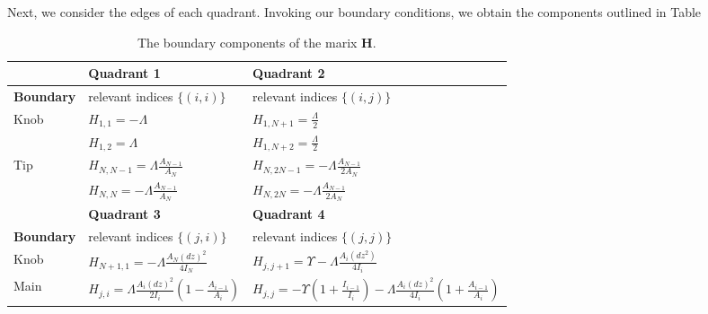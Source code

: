 \documentclass[linenumbers]{aastex7}
\begin{document}
Next, we consider the edges of each quadrant. Invoking our boundary conditions, we obtain the components outlined in Table 

\begin{table}[h!]
    \centering
    {\renewcommand{\arraystretch}{1.6}
    \begin{tabular}{|p{}|p{}|p{}|}
        \hline
        &\textbf{Quadrant 1} & \textbf{Quadrant 2} \\ 
        \hline
        \textbf{Boundary}&  relevant indices $\{(i, i)\}$ & relevant indices $\{(i, j)\}$\\

        \hline \hline
        Knob
        & $\displaystyle H_{1,1} = -\Lambda$
        & $\displaystyle H_{1, N+1} = \frac{\Lambda}{2}$
        \\
        & $\displaystyle H_{1, 2} = \Lambda$
        & $\displaystyle H_{1, N+2} = \frac{\Lambda}{2}$
        \\

        Tip
        & $\displaystyle H_{N,N-1} = \Lambda \frac{A_{N-1}}{A_N}$
        & $\displaystyle H_{N, 2N-1} = -\Lambda \frac{A_{N-1}}{2A_N}$
        \\

        & $\displaystyle H_{N,N} = -\Lambda \frac{A_{N-1}}{A_N}$
        & $\displaystyle H_{N, 2N} = -\Lambda \frac{A_{N-1}}{2A_N}$
        \\
        

        \hline 
        \hline
        & \textbf{Quadrant 3} & \textbf{Quadrant 4} \\ 
        \hline
        \textbf{Boundary}& relevant indices $\{(j, i)\}$ & relevant indices $\{(j, j)\}$\\

        \hline \hline
        Knob
        & $\displaystyle H_{N+1, 1} = -\Lambda \frac{A_N(dz)^2}{4I_N}$
        & $\displaystyle H_{j, j+1} = \Upsilon - \Lambda \frac{A_i (dz^2)}{4I_i}$
        \\
        Main 
        & $\displaystyle H_{j,i} = \Lambda \frac{A_i (dz)^2}{2I_i}\left(1 - \frac{A_{i-1}}{A_i}\right)$
        & $\displaystyle H_{j, j} = -\Upsilon\left(1 + \frac{I_{i-1}}{I_i}\right) - \Lambda\frac{A_i (dz)^2}{4I_i}\left(1+\frac{A_{i-1}}{A_i}\right) $
        \\
        \hline
    \end{tabular}
    }
    \caption{The boundary components of the marix $\mathbf{H}$.}
    \label{tab:Hboundary}
\end{table}
\end{document}
